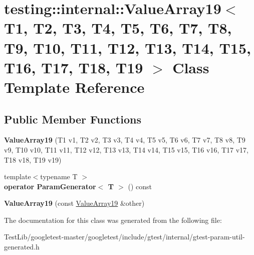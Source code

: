 \hypertarget{classtesting_1_1internal_1_1ValueArray19}{}\section{testing\+:\+:internal\+:\+:Value\+Array19$<$ T1, T2, T3, T4, T5, T6, T7, T8, T9, T10, T11, T12, T13, T14, T15, T16, T17, T18, T19 $>$ Class Template Reference}
\label{classtesting_1_1internal_1_1ValueArray19}
\subsection*{Public Member Functions}
\begin{DoxyCompactItemize}
\item 
\mbox{\label{classtesting_1_1internal_1_1ValueArray19_a1ffcdacd1ffb1d6718187a66458c09e2}} 
{\bfseries Value\+Array19} (T1 v1, T2 v2, T3 v3, T4 v4, T5 v5, T6 v6, T7 v7, T8 v8, T9 v9, T10 v10, T11 v11, T12 v12, T13 v13, T14 v14, T15 v15, T16 v16, T17 v17, T18 v18, T19 v19)
\item 
\mbox{\label{classtesting_1_1internal_1_1ValueArray19_a8ddd6c1de46e25310cf844895c7c8cf6}} 
{\footnotesize template$<$typename T $>$ }\\{\bfseries operator Param\+Generator$<$ T $>$} () const
\item 
\mbox{\label{classtesting_1_1internal_1_1ValueArray19_a1029ebc5d39633e2fb278e051d0ec1d0}} 
{\bfseries Value\+Array19} (const \hyperlink{classtesting_1_1internal_1_1ValueArray19}{Value\+Array19} \&other)
\end{DoxyCompactItemize}


The documentation for this class was generated from the following file\+:\begin{DoxyCompactItemize}
\item 
Test\+Lib/googletest-\/master/googletest/include/gtest/internal/gtest-\/param-\/util-\/generated.\+h\end{DoxyCompactItemize}
